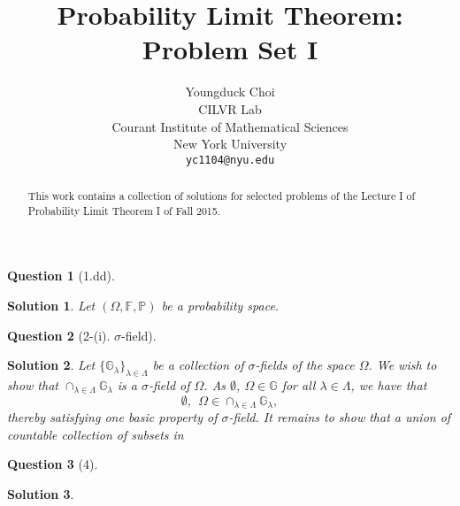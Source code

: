 \documentclass{article} %
\title{Probability Limit Theorem: \\
Problem Set I}
\author{
Youngduck Choi \\
CILVR Lab \\
Courant Institute of Mathematical Sciences \\
New York University\\
\texttt{yc1104@nyu.edu} \\
}
\theoremstyle{quest}
\newtheorem*{question}{Question}
\newtheorem*{solution}{Solution}
\begin{document}
\maketitle

\begin{abstract}
This work contains a collection of solutions for selected problems 
of the Lecture I of
Probability Limit Theorem I of Fall 2015.
\end{abstract}

\begin{question}[1.dd]
\end{question}
\begin{solution}
Let $( \Omega, \mathbb{F}, \mathbb{P})$ be a probability space. 
\end{solution}

\bigskip

\begin{question}[2-(i). $\sigma$-field]
\end{question}
\begin{solution}
Let $\{ \mathbb{G}_{\lambda} \}_{\lambda \in \Lambda}$ be a collection of $\sigma$-fields
of the space $\Omega$.
We wish to show that $\cap_{\lambda \in \Lambda} \mathbb{G}_{\lambda}$ is a $\sigma$-field of $\Omega$.
As $\emptyset$, $\Omega \in \mathbb{G}$ for all $\lambda \in \Lambda$, we have that
\[
\emptyset, \>\> \Omega \in \cap_{\lambda \in \Lambda} \mathbb{G}_{\lambda},
\]
thereby satisfying one basic property of $\sigma$-field. It remains to show that 
a union of countable collection of subsets in 

\end{solution}

\bigskip

\begin{question}[4]
\end{question}
\begin{solution}
\end{solution}
\end{document}
